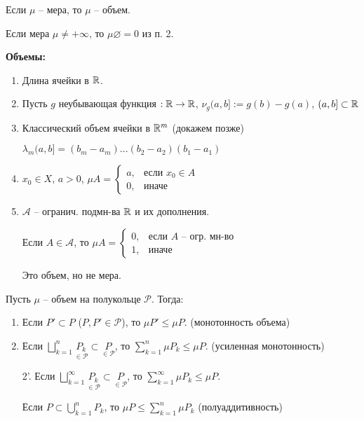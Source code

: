 \begin{remark} 
    Если $\mu$ – мера, то $\mu$ – объем.
\end{remark}

\begin{exercise}
    Если мера $\mu \not = +\infty$, то $\mu \varnothing = 0$ из п. 2.
\end{exercise}

\begin{example}
    \textbf{Объемы:}

    \begin{enumerate}
        \item Длина ячейки в $\mathbb{R}$.
        \item Пусть $g$ неубывающая функция $:\mathbb{R}\rightarrow \mathbb{R}$, $\nu_g(a, b]:=g(b)- g(a)$, $(a, b]\subset \mathbb{R}$
        \item Классический объем ячейки в $\mathbb{R}^m$ (докажем позже)
        
        $\lambda_m(a, b] = (b_m - a_m)...(b_2 - a_2)(b_1 - a_1)$
        \item $x_0\in X$, $a>0$, $\mu A =\left\{\begin{array}{ll}
            a, & \text{если } x_0\in A  \\
            0, & \text{иначе} 
       \end{array}\right.$
        \item $\mathcal{A}$ – огранич. подмн-ва $\mathbb{R}$ и их дополнения. 
        
        Если $A\in \mathcal{A}$, то $\mu A=\left\{\begin{array}{ll}
            0, & \text{если } A \text{ – огр. мн-во}  \\
            1, & \text{иначе} 
        \end{array}\right.$

        Это объем, но не мера.
    \end{enumerate}
\end{example}

\begin{theorem}
    Пусть $\mu$ – объем на полукольце $\mathcal{P}$. Тогда:

    \begin{enumerate}
        \item Если $P'\subset P$ ($P, P'\in \mathcal{P}$), то $\mu P' \leq \mu P$. (монотонность объема)
        \item Если $\bigsqcup\limits_{k=1}^n \underset{\in\mathcal{P}}{P_k}\subset \underset{\in\mathcal{P}}{P}$, то $\sum\limits_{k=1}^n \mu P_k \leq \mu P$. (усиленная монотонность)
        \item[2'.] Если $\bigsqcup\limits_{k=1}^\infty \underset{\in\mathcal{P}}{P_k}\subset \underset{\in\mathcal{P}}{P}$, то $\sum\limits_{k=1}^\infty \mu P_k \leq \mu P$.
        \item[] Если $P\subset \bigcup\limits_{k=1}^n P_k$, то $\mu P \leq \sum\limits_{k=1}^n \mu P_k$ (полуаддитивность)
    \end{enumerate}
\end{theorem}

